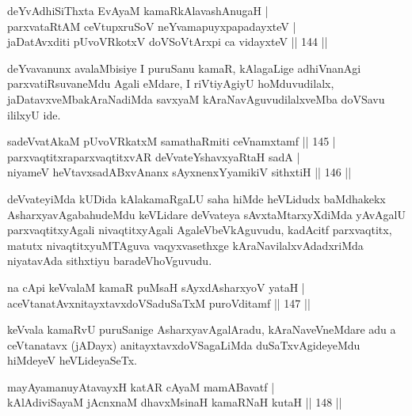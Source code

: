 
\begin{shl}
deYvAdhiSiThxta EvAyaM kamaRkAlavashAnugaH |\\
parxvataRtAM ceVtupxruSoV neYvamapuyxpapadayxteV |\\
jaDatAvxditi pUvoVRkotxV doVSoV\s tArxpi ca vidayxteV \hfill || 144 ||
\end{shl}

\begin{artha}
deYvavanunx avalaMbisiye I puruSanu kamaR, kAlagaLige adhiVnanAgi  parxvatiRsuvaneMdu Agali eMdare, I riVtiyAgiyU hoMduvudilalx, jaDatavxveMbakAraNadiMda savxyaM kAraNavAguvudilalxveMba doVSavu ililxyU ide.
\end{artha}


\begin{shl}
sadeVvatAkaM pUvoVRkatxM samathaRmiti ceVnamxtamf \hfill || 145 |\\
parxvaqtitxraparxvaqtitxvAR deVvateYshavxyaRtaH sadA |\\
niyameV heVtavxsadABxvAnanx sAyxnenxYyamikiV sithxtiH \hfill || 146 ||
\end{shl}

\begin{artha}
deVvateyiMda kUDida kAlakamaRgaLU saha hiMde heVLidudx baMdhakekx AsharxyavAgabahudeMdu keVLidare deVvateya sAvxtaMtarxyXdiMda yAvAgalU parxvaqtitxyAgali nivaqtitxyAgali AgaleVbeVkAguvudu, kadAcitf parxvaqtitx, matutx nivaqtitxyuMTAguva vaqyxvasethxge kAraNavilalxvAdadxriMda niyatavAda sithxtiyu baradeVhoVguvudu.
\end{artha}


\begin{shl}
na cApi keVvalaM kamaR puMsaH sAyxdAsharxyoV yataH |\\
aceVtanatAvxnitayxtavxdoVSaduSaTxM puroVditamf \hfill || 147 ||
\end{shl}

\begin{artha}
keVvala kamaRvU puruSanige AsharxyavAgalAradu, kAraNaveVneMdare adu a ceVtanatavx (jADayx) anitayxtavxdoVSagaLiMda duSaTxvAgideyeMdu hiMdeyeV heVLideyaSeTx.
\end{artha}

\begin{shl}
mayA\s yamanuyAtavayxH katAR cAyaM mamABavatf |\\
kAlAdiviSayaM jAcnxnaM dhavxMsinaH kamaRNaH kutaH \hfill || 148 ||
\end{shl}

